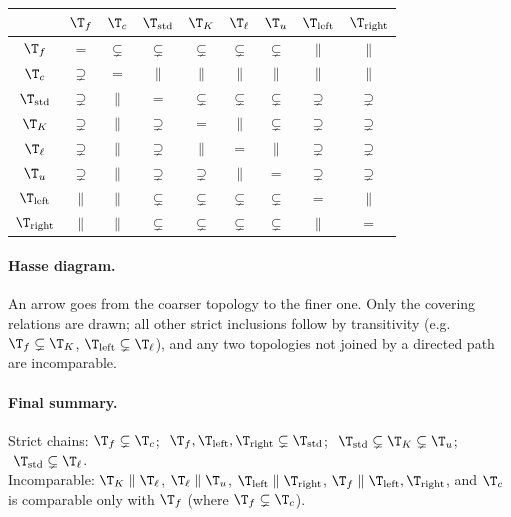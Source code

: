 \begin{center}
\small
\renewcommand{\arraystretch}{1.3}
\begin{tabular}{c|cccccccc}
 & $\T_f$ & $\T_c$ & $\T_{\mathrm{std}}$ & $\T_K$ & $\T_\ell$ & $\T_u$ & $\T_{\mathrm{left}}$ & $\T_{\mathrm{right}}$\\\hline
$\T_f$ & $=$ & $\subsetneq$ & $\subsetneq$ & $\subsetneq$ & $\subsetneq$ & $\subsetneq$ & $\parallel$ & $\parallel$\\
$\T_c$ & $\supsetneq$ & $=$ & $\parallel$ & $\parallel$ & $\parallel$ & $\parallel$ & $\parallel$ & $\parallel$\\
$\T_{\mathrm{std}}$ & $\supsetneq$ & $\parallel$ & $=$ & $\subsetneq$ & $\subsetneq$ & $\subsetneq$ & $\supsetneq$ & $\supsetneq$\\
$\T_K$ & $\supsetneq$ & $\parallel$ & $\supsetneq$ & $=$ & $\parallel$ & $\subsetneq$ & $\supsetneq$ & $\supsetneq$\\
$\T_\ell$ & $\supsetneq$ & $\parallel$ & $\supsetneq$ & $\parallel$ & $=$ & $\parallel$ & $\supsetneq$ & $\supsetneq$\\
$\T_u$ & $\supsetneq$ & $\parallel$ & $\supsetneq$ & $\supsetneq$ & $\parallel$ & $=$ & $\supsetneq$ & $\supsetneq$\\
$\T_{\mathrm{left}}$ & $\parallel$ & $\parallel$ & $\subsetneq$ & $\subsetneq$ & $\subsetneq$ & $\subsetneq$ & $=$ & $\parallel$\\
$\T_{\mathrm{right}}$ & $\parallel$ & $\parallel$ & $\subsetneq$ & $\subsetneq$ & $\subsetneq$ & $\subsetneq$ & $\parallel$ & $=$
\end{tabular}
\end{center}

\paragraph{Hasse diagram.}
An arrow goes from the coarser topology to the finer one. Only the covering relations are drawn;
all other strict inclusions follow by transitivity (e.g.\ $\T_f\subsetneq\T_K$,
$\T_{\mathrm{left}}\subsetneq\T_\ell$), and any two topologies not joined by a directed path
are incomparable.

\begin{center}

\end{center}

\paragraph{Final summary.}
Strict chains: $\T_f\subsetneq\T_c$;
$\ \T_f,\T_{\mathrm{left}},\T_{\mathrm{right}}\subsetneq\T_{\mathrm{std}}$;
$\ \T_{\mathrm{std}}\subsetneq\T_K\subsetneq\T_u$; $\ \T_{\mathrm{std}}\subsetneq\T_\ell$.\\
Incomparable: $\T_K\parallel\T_\ell$, $\T_\ell\parallel\T_u$,
$\T_{\mathrm{left}}\parallel\T_{\mathrm{right}}$,
$\T_f\parallel\T_{\mathrm{left}},\T_{\mathrm{right}}$, and $\T_c$ is comparable only with $\T_f$
(where $\T_f\subsetneq\T_c$).
